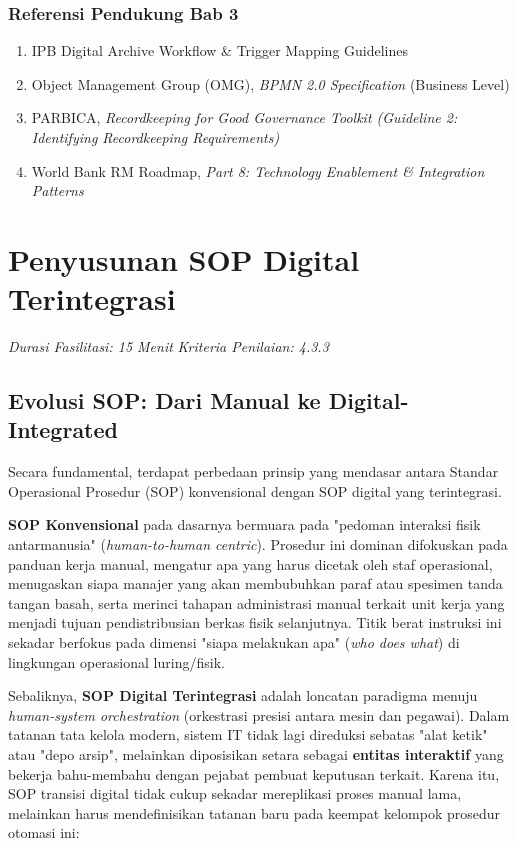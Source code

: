 \documentclass[12pt,a4paper]{report}
\begin{document}
\subsection*{Referensi Pendukung Bab 3}
\begin{enumerate}[leftmargin=*, nosep]
    \item IPB Digital Archive Workflow \& Trigger Mapping Guidelines
    \item Object Management Group (OMG), \textit{BPMN 2.0 Specification} (Business Level)
    \item PARBICA, \textit{Recordkeeping for Good Governance Toolkit (Guideline 2: Identifying Recordkeeping Requirements)}
    \item World Bank RM Roadmap, \textit{Part 8: Technology Enablement \& Integration Patterns}
\end{enumerate}

\newpage
\chapter{Penyusunan SOP Digital Terintegrasi}
\textit{Durasi Fasilitasi: 15 Menit} \quad \textit{Kriteria Penilaian: 4.3.3}

\section{Evolusi SOP: Dari Manual ke Digital-Integrated}

Secara fundamental, terdapat perbedaan prinsip yang mendasar antara Standar Operasional Prosedur (SOP) konvensional dengan SOP digital yang terintegrasi. 

\textbf{SOP Konvensional} pada dasarnya bermuara pada "pedoman interaksi fisik antarmanusia" (\textit{human-to-human centric}). Prosedur ini dominan difokuskan pada panduan kerja manual, mengatur apa yang harus dicetak oleh staf operasional, menugaskan siapa manajer yang akan membubuhkan paraf atau spesimen tanda tangan basah, serta merinci tahapan administrasi manual terkait unit kerja yang menjadi tujuan pendistribusian berkas fisik selanjutnya. Titik berat instruksi ini sekadar berfokus pada dimensi "siapa melakukan apa" (\textit{who does what}) di lingkungan operasional luring/fisik.

Sebaliknya, \textbf{SOP Digital Terintegrasi} adalah loncatan paradigma menuju \textit{human-system orchestration} (orkestrasi presisi antara mesin dan pegawai). Dalam tatanan tata kelola modern, sistem IT tidak lagi direduksi sebatas "alat ketik" atau "depo arsip", melainkan diposisikan setara sebagai \textbf{entitas interaktif} yang bekerja bahu-membahu dengan pejabat pembuat keputusan terkait. Karena itu, SOP transisi digital tidak cukup sekadar mereplikasi proses manual lama, melainkan harus mendefinisikan tatanan baru pada keempat kelompok prosedur otomasi ini:
\end{document}
